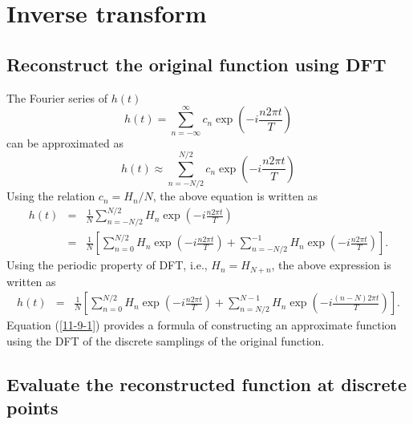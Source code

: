 \documentclass{article}
\begin{document}
\section{Inverse transform}

\subsection{Reconstruct the original function using DFT}

The Fourier series of $h (t)$
\begin{equation}
  h (t) = \sum_{n = - \infty}^{\infty} c_n \exp \left( - i \frac{n 2 \pi t}{T}
  \right)
\end{equation}
can be approximated as
\begin{equation}
  h (t) \approx \sum_{n = - N / 2}^{N / 2} c_n \exp \left( - i \frac{n 2 \pi
  t}{T} \right)
\end{equation}
Using the relation $c_n = H_n / N$, the above equation is written as
\begin{eqnarray}
  h (t) & = & \frac{1}{N} \sum_{n = - N / 2}^{N / 2} H_n \exp \left( - i
  \frac{n 2 \pi t}{T} \right) \nonumber\\
  & = & \frac{1}{N} \left[ \sum_{n = 0}^{N / 2} H_n \exp \left( - i \frac{n 2
  \pi t}{T} \right) + \sum_{n = - N / 2}^{- 1} H_n \exp \left( - i \frac{n 2
  \pi t}{T} \right) \right] . 
\end{eqnarray}
Using the periodic property of DFT, i.e., $H_n = H_{N + n}$, the above
expression is written as
\begin{eqnarray}
  h (t) & = & \frac{1}{N} \left[ \sum_{n = 0}^{N / 2} H_n \exp \left( - i
  \frac{n 2 \pi t}{T} \right) + \sum_{n = N / 2}^{N - 1} H_n \exp \left( - i
  \frac{(n - N) 2 \pi t}{T} \right) \right] .  \label{11-9-1}
\end{eqnarray}
Equation (\ref{11-9-1}) provides a formula of constructing an approximate
function using the DFT of the discrete samplings of the original function.

\subsection{Evaluate the reconstructed function at discrete points}
\end{document}
